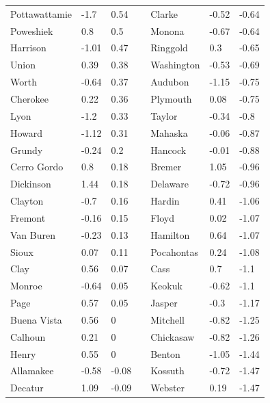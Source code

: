 \documentclass[11pt]{article}
\begin{document}
\begin{table}[H]
\begin{tabular}{lllllll}
Pottawattamie & -1.7      & 0.54   &  & Clarke     & -0.52     & -0.64  \\
Poweshiek     & 0.8       & 0.5    &  & Monona     & -0.67     & -0.64  \\
Harrison      & -1.01     & 0.47   &  & Ringgold   & 0.3       & -0.65  \\
Union         & 0.39      & 0.38   &  & Washington & -0.53     & -0.69  \\
Worth         & -0.64     & 0.37   &  & Audubon    & -1.15     & -0.75  \\
Cherokee      & 0.22      & 0.36   &  & Plymouth   & 0.08      & -0.75  \\
Lyon          & -1.2      & 0.33   &  & Taylor     & -0.34     & -0.8   \\
Howard        & -1.12     & 0.31   &  & Mahaska    & -0.06     & -0.87  \\
Grundy        & -0.24     & 0.2    &  & Hancock    & -0.01     & -0.88  \\
Cerro Gordo   & 0.8       & 0.18   &  & Bremer     & 1.05      & -0.96  \\
Dickinson     & 1.44      & 0.18   &  & Delaware   & -0.72     & -0.96  \\
Clayton       & -0.7      & 0.16   &  & Hardin     & 0.41      & -1.06  \\
Fremont       & -0.16     & 0.15   &  & Floyd      & 0.02      & -1.07  \\
Van Buren     & -0.23     & 0.13   &  & Hamilton   & 0.64      & -1.07  \\
Sioux         & 0.07      & 0.11   &  & Pocahontas & 0.24      & -1.08  \\
Clay          & 0.56      & 0.07   &  & Cass       & 0.7       & -1.1   \\
Monroe        & -0.64     & 0.05   &  & Keokuk     & -0.62     & -1.1   \\
Page          & 0.57      & 0.05   &  & Jasper     & -0.3      & -1.17  \\
Buena Vista   & 0.56      & 0      &  & Mitchell   & -0.82     & -1.25  \\
Calhoun       & 0.21      & 0      &  & Chickasaw  & -0.82     & -1.26  \\
Henry         & 0.55      & 0      &  & Benton     & -1.05     & -1.44  \\
Allamakee     & -0.58     & -0.08  &  & Kossuth    & -0.72     & -1.47  \\
Decatur       & 1.09      & -0.09  &  & Webster    & 0.19      & -1.47  \\

\end{tabular}
\end{table}
\end{document}
